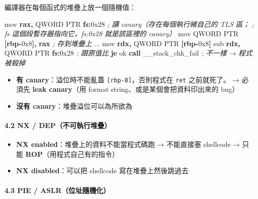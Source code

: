 \documentclass[10pt,a4paper]{article}
\newenvironment{Shaded}{\begin{snugshade}}{\end{snugshade}}
\newcommand{\BaseNTok}[1]{\textcolor[rgb]{0.00,0.00,0.81}{#1}}
\newcommand{\BuiltInTok}[1]{#1}
\newcommand{\CommentTok}[1]{\textcolor[rgb]{0.56,0.35,0.01}{\textit{#1}}}
\newcommand{\ControlFlowTok}[1]{\textcolor[rgb]{0.13,0.29,0.53}{\textbf{#1}}}
\newcommand{\DataTypeTok}[1]{\textcolor[rgb]{0.13,0.29,0.53}{#1}}
\newcommand{\KeywordTok}[1]{\textcolor[rgb]{0.13,0.29,0.53}{\textbf{#1}}}
\newcommand{\NormalTok}[1]{#1}
\newcommand{\OperatorTok}[1]{\textcolor[rgb]{0.81,0.36,0.00}{\textbf{#1}}}
\renewenvironment{Shaded}{%
  \def\FrameCommand{\fboxsep=3.2pt\colorbox{shadecolor}}%
  \MakeFramed{\advance\hsize-\width\FrameRestore\small}%
}{%
  \endMakeFramed
}
\providecommand{\tightlist}{%
  \setlength{\itemsep}{0pt}\setlength{\parskip}{0pt}}
\begin{document}
編譯器在每個函式的堆疊上放一個隨機值：

\begin{Shaded}
\begin{Highlighting}[]
\BuiltInTok{mov}  \KeywordTok{rax}\OperatorTok{,} \DataTypeTok{QWORD} \DataTypeTok{PTR} \KeywordTok{fs}\OperatorTok{:}\BaseNTok{0x28}     \CommentTok{; 讀 canary（存在每個執行緒自己的 TLS 區；}
                               \CommentTok{;  fs 這個段暫存器指向它，fs:0x28 就是該區裡的 canary）}
\BuiltInTok{mov}  \DataTypeTok{QWORD} \DataTypeTok{PTR} \OperatorTok{[}\KeywordTok{rbp}\OperatorTok{{-}}\BaseNTok{0x8}\OperatorTok{],} \KeywordTok{rax}   \CommentTok{; 存到堆疊上}
\NormalTok{...}
\BuiltInTok{mov}  \KeywordTok{rdx}\OperatorTok{,} \DataTypeTok{QWORD} \DataTypeTok{PTR} \OperatorTok{[}\KeywordTok{rbp}\OperatorTok{{-}}\BaseNTok{0x8}\OperatorTok{]}
\BuiltInTok{sub}  \KeywordTok{rdx}\OperatorTok{,} \DataTypeTok{QWORD} \DataTypeTok{PTR} \KeywordTok{fs}\OperatorTok{:}\BaseNTok{0x28}     \CommentTok{; 跟原值比}
\ControlFlowTok{je}\NormalTok{   ok}
\ControlFlowTok{call}\NormalTok{ \_\_stack\_chk\_fail           }\CommentTok{; 不一樣 → 程式被殺掉}
\end{Highlighting}
\end{Shaded}

\begin{itemize}
\tightlist
\item
  \textbf{有 canary}：溢位時不能亂蓋 \texttt{{[}rbp-\allowbreak{}8{]}}，否則程式在
  \texttt{ret} 之前就死了。 → 必須先 \textbf{leak canary}（用 format
  string、或是某個會把資料印出來的 bug）
\item
  \textbf{沒有 canary}：堆疊溢位可以為所欲為
\end{itemize}

\paragraph{4.2 NX /
DEP（不可執行堆疊）}\label{nx-depux4e0dux53efux57f7ux884cux5806ux758a}

\begin{itemize}
\tightlist
\item
  \textbf{NX enabled}：堆疊上的資料不能當程式碼跑 → 不能直接塞 shellcode
  → 只能 \textbf{ROP}（用程式自己有的指令）
\item
  \textbf{NX disabled}：可以把 shellcode 寫在堆疊上然後跳過去
\end{itemize}

\paragraph{4.3 PIE /
ASLR（位址隨機化）}\label{pie-aslrux4f4dux5740ux96a8ux6a5fux5316}
\end{document}

